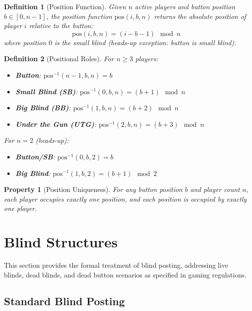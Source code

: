 \documentclass[11pt,a4paper]{article}
\newtheorem{definition}{Definition}[section]
\newtheorem{property}{Property}[section]
\begin{document}
\begin{definition}[Position Function]
\label{def:position}
Given $n$ active players and button position $b \in [0, n-1]$, the position function $\text{pos}(i, b, n)$ returns the absolute position of player $i$ relative to the button:
\[
\text{pos}(i, b, n) = (i - b - 1) \mod n
\]
where position $0$ is the small blind (heads-up exception: button is small blind).
\end{definition}

\begin{definition}[Positional Roles]
\label{def:roles}
For $n \geq 3$ players:
\begin{itemize}
    \item \textbf{Button}: $\text{pos}^{-1}(n-1, b, n) = b$
    \item \textbf{Small Blind (SB)}: $\text{pos}^{-1}(0, b, n) = (b + 1) \mod n$
    \item \textbf{Big Blind (BB)}: $\text{pos}^{-1}(1, b, n) = (b + 2) \mod n$
    \item \textbf{Under the Gun (UTG)}: $\text{pos}^{-1}(2, b, n) = (b + 3) \mod n$
\end{itemize}

For $n = 2$ (heads-up):
\begin{itemize}
    \item \textbf{Button/SB}: $\text{pos}^{-1}(0, b, 2) = b$
    \item \textbf{Big Blind}: $\text{pos}^{-1}(1, b, 2) = (b + 1) \mod 2$
\end{itemize}
\end{definition}

\begin{property}[Position Uniqueness]
For any button position $b$ and player count $n$, each player occupies exactly one position, and each position is occupied by exactly one player.
\end{property}

\section{Blind Structures}
\label{sec:blinds}

This section provides the formal treatment of blind posting, addressing live blinds, dead blinds, and dead button scenarios as specified in gaming regulations.

\subsection{Standard Blind Posting}
\end{document}
